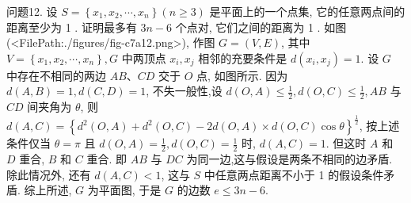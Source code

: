 问题12. 设 $S=\left\{x_1, x_2, \cdots, x_n\right\}(n \geqslant 3)$ 是平面上的一个点集, 它的任意两点间的距离至少为 1 . 证明最多有 $3 n-6$ 个点对, 它们之间的距离为 1 .
如图(<FilePath:./figures/fig-c7a12.png>), 作图 $G=(V, E)$, 其中 $V=\left\{x_1, x_2, \cdots, x_n\right\}, G$ 中两顶点 $x_i, x_j$ 相邻的充要条件是 $d\left(x_i, x_j\right)=1$. 设 $G$ 中存在不相同的两边 $A B 、 C D$ 交于 $O$ 点, 如图所示.
因为 $d(A, B)=1, d(C, D)=1$, 不失一般性,设 $d(O, A) \leqslant \frac{1}{2}, d(O, C) \leqslant \frac{1}{2}, A B$ 与 $C D$ 间夹角为 $\theta$, 则 $d(A, C)= \left\{d^2(O, A)+d^2(O, C)-2 d(O, A) \times d(O, C) \cos \theta\right\}^{\frac{1}{2}}$,
按上述条件仅当 $\theta=\pi$ 且 $d(O, A)=\frac{1}{2}, d(O, C)=\frac{1}{2}$ 时, $d(A, C)=1$. 但这时 $A$ 和 $D$ 重合, $B$ 和 $C$ 重合.
即 $A B$ 与 $D C$ 为同一边,这与假设是两条不相同的边矛盾.
除此情况外, 还有 $d(A, C)<1$, 这与 $S$ 中任意两点距离不小于 1 的假设条件矛盾.
综上所述, $G$ 为平面图, 于是 $G$ 的边数 $e \leqslant 3 n-6$.


